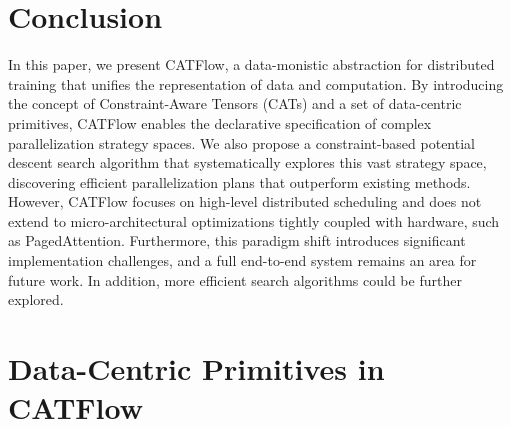 \documentclass[letterpaper,twocolumn,10pt]{article}
\newcommand{\name}{CATFlow}
\begin{document}
\section{Conclusion}

In this paper, we present \name{}, a data-monistic abstraction for distributed training that unifies the representation of data and computation. By introducing the concept of Constraint-Aware Tensors (CATs) and a set of data-centric primitives, \name{} enables the declarative specification of complex parallelization strategy spaces. We also propose a constraint-based potential descent search algorithm that systematically explores this vast strategy space, discovering efficient parallelization plans that outperform existing methods. However, \name{} focuses on high-level distributed scheduling and does not extend to micro-architectural optimizations tightly coupled with hardware, such as PagedAttention. Furthermore, this paradigm shift introduces significant implementation challenges, and a full end-to-end system remains an area for future work. In addition, more efficient search algorithms could be further explored.




\appendix

\section{Data-Centric Primitives in \name{}}
\label{sec:all_primitives}
\end{document}
